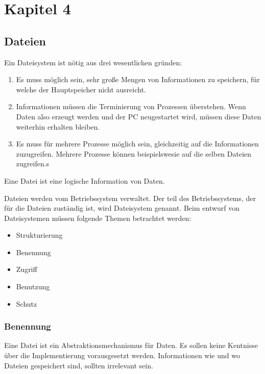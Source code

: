 \chapter{Kapitel 4}

\section{Dateien}

Ein Dateisystem ist nötig aus drei wesentlichen gründen:

\begin{enumerate}
    \item Es muss möglich sein, sehr große Mengen von Informationen zu speichern, für
          welche der Hauptspeicher nicht ausreicht.
    \item Informationen müssen die Terminierung von Prozessen überstehen. Wenn Daten also
          erzeugt werden und der PC neugestartet wird, müssen diese Daten weiterhin
          erhalten bleiben.
    \item Es muss für mehrere Prozesse möglich sein, gleichzeitig auf die
          In\-for\-mation\-en zuzugreifen. Mehrere Prozesse können beispielswesie auf die
          selben Dateien zugreifen.s
\end{enumerate}

Eine Datei ist eine logische Information von Daten.

Dateien werden vom Betriebssystem verwaltet. Der teil des Betriebssystems, der
für die Dateien zuständig ist, wird Dateisystem genannt. Beim entwurf von
Dateisystemen müssen folgende Themen betrachtet werden:

\begin{itemize}
    \item Strukturierung
    \item Benennung
    \item Zugriff
    \item Benutzung
    \item Schutz
\end{itemize}

\subsection{Benennung}

Eine Datei ist ein Abstraktionsmechanismus für Daten. Es sollen keine Kentnisse
über die Implementierung vorausgesetzt werden. Informationen wie und wo Dateien
gespeichert sind, sollten irrelevant sein.


